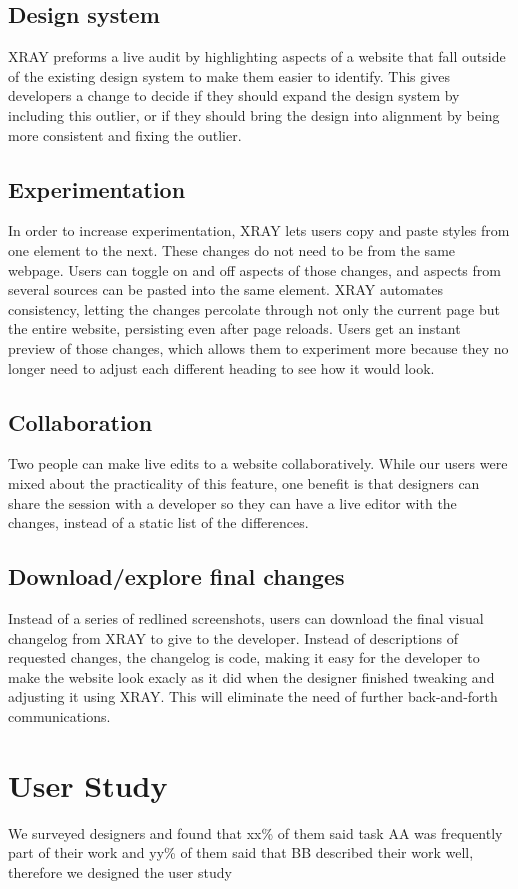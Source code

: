 \documentclass{sigchi}
\newcommand{\xray}{XRAY\xspace}
\begin{document}
\subsection{Design system}
\xray preforms a live audit by highlighting aspects of a website that fall outside of the existing design system to make them easier to identify. This gives developers a change to decide if they should expand the design system by including this outlier, or if they should bring the design into alignment by being more consistent and fixing the outlier. 

\subsection{Experimentation}
In order to increase experimentation, \xray lets users copy and paste styles from one element to the next. These changes do not need to be from the same webpage. Users can toggle on and off aspects of those changes, and aspects from several sources can be pasted into the same element. \xray automates consistency, letting the changes percolate through not only the current page but the entire website, persisting even after page reloads. Users get an instant preview of those changes, which allows them to experiment more because they no longer need to adjust each different heading to see how it would look. 

\subsection{Collaboration}
Two people can make live edits to a website collaboratively. While our users were mixed about the practicality of this feature, one benefit is that designers can share the session with a developer so they can have a live editor with the changes, instead of a static list of the differences. 

\subsection{Download/explore final changes}
Instead of a series of redlined screenshots, users can download the final visual changelog from \xray to give to the developer. Instead of descriptions of requested changes, the changelog is code, making it easy for the developer to make the website look exacly as it did when the designer finished tweaking and adjusting it using \xray. This will eliminate the need of further back-and-forth communications. 

\section{User Study}
We surveyed designers and found that xx\% of them said task AA was frequently part of their work and yy\% of them said that BB described their work well, therefore we designed the user study 
\end{document}
